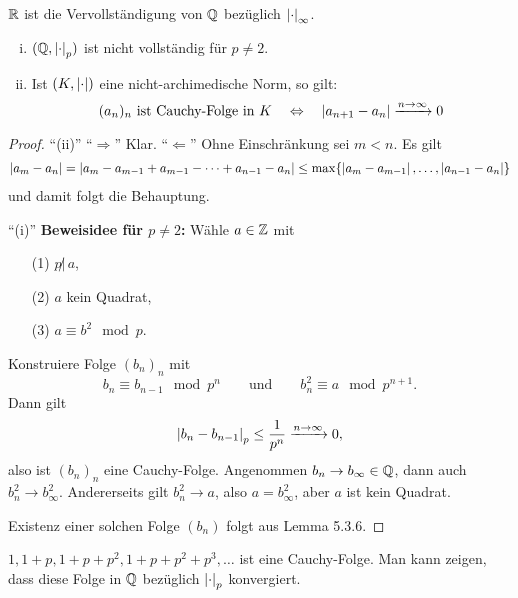 \begin{Fakt}
$\mathbb{R}$ ist die Vervollständigung von $\mathbb{Q}$ bezüglich $\left|{\cdot}\right|_\infty$.
\end{Fakt}

\begin{Prop}
\begin{enumerate}[(i)]
\item $(\mathbb{Q}, \left|{\cdot}\right|_p)$ ist nicht vollständig für $p\neq 2$.
\item Ist $(K,\left|{\cdot}\right|)$ eine nicht-archimedische Norm, so gilt:
\[ (a_n)_n \text{ ist Cauchy-Folge in } K \quad \Leftrightarrow \quad 
\left|{a_{n+1} - a_n}\right| \xrightarrow{n \to \infty} 0
\]
\end{enumerate}
\end{Prop}

\begin{proof}
\enquote{(ii)} \enquote{$\Rightarrow$} Klar. \enquote{$\Leftarrow$} Ohne Einschränkung sei $m< n$. Es gilt
\begin{align*}
\left|{a_m-a_n}\right|
=\left|{a_m-a_{m-1} + a_{m-1} - \cdots + a_{n-1} -a_n }\right|
\leq \max \{ \left|{a_{m}-a_{m-1}}\right|, \dots, \left|{ a_{n-1} -a_n }\right|  \}
\end{align*}	
und damit folgt die Behauptung.

\bigskip \enquote{(i)} \textbf{Beweisidee für $p\neq 2$:}
Wähle $a \in  \mathbb{Z}$ mit 
\begin{itemize}
\item[(1)] $p \not | \,a$,
\item[(2)] $a$ kein Quadrat,
\item[(3)] $a\equiv b^2 \mod p$.
\end{itemize}
Konstruiere Folge $(b_n)_n$ mit
\[ b_n \equiv b_{n-1} \mod p^n
\qquad \text{und} \qquad
b_n^2 \equiv a \mod p^{n+1}.
\]
Dann gilt 
\[ \left|{b_n-b_{n-1}}\right|_p \leq \frac{1}{p^n} \xrightarrow{n \to \infty}0,
\]
also ist $(b_n)_n$ eine Cauchy-Folge.
Angenommen $b_n \to b_\infty \in \mathbb{Q}$, dann auch $b_n^2 \to b_\infty^2$.
Andererseits gilt $b_n^2 \to a$, also $a=b_\infty^2$, aber $a$ ist kein Quadrat.

\bigskip Existenz einer solchen Folge $(b_n)$ folgt aus Lemma 5.3.6.
\end{proof}



\begin{Bsp}
$1, 1+p, 1+p+p^2, 1+p+p^2+p^3, \dots$ ist eine Cauchy-Folge. Man kann zeigen, dass diese Folge  in $\mathbb{Q}$ bezüglich $\left|{\cdot}\right|_p$ konvergiert.
\end{Bsp}

